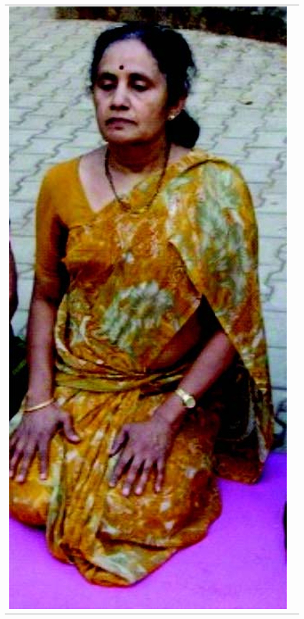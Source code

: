 \begin{center}
\begin{tabular}{@{}cc@{}}
\includegraphics[scale=.6]{images/092.jpg} &

\end{tabular}
\end{center}
